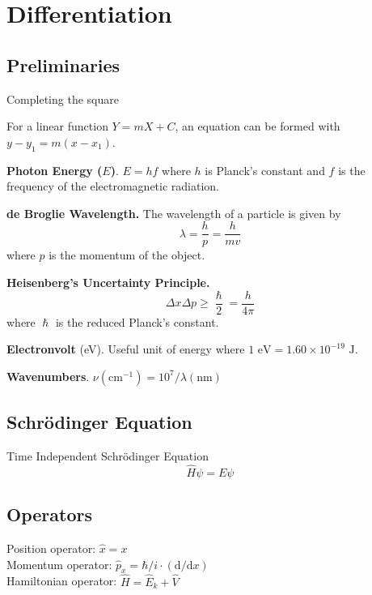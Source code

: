 
\section{Differentiation}

\subsection*{Preliminaries}

Completing the square

For a linear function $Y = mX + C$, an equation can be formed with $y - y_1 = m(x - x_1)$.

\textbf{Photon Energy ($E$)}. $E = hf$ where
$h$ is Planck's constant and $f$ is the frequency of the electromagnetic
radiation.
\vspace{\baselineskip}

\textbf{de Broglie Wavelength.} The wavelength of a particle is given by
\begin{equation*} \lambda = \frac{h}{p} = \frac{h}{mv} \end{equation*} where $p$
is the momentum of the object.
\vspace{\baselineskip}

\textbf{Heisenberg's Uncertainty Principle.} \begin{equation*} \Delta x \Delta p \geq \frac{\hslash}{2} =
  \frac{h}{4\pi} \end{equation*} where $\hslash$ is the reduced Planck's constant.
\vspace{\baselineskip}

\textbf{Electronvolt} (eV). Useful unit of energy where $1 \textrm{ eV} = 1.60 \times 10^{-19} \textrm{ J}$.
\vspace{\baselineskip}

\textbf{Wavenumbers}. $\nu(\mathrm{cm}^{-1}) = 10^7 / \lambda (\mathrm{nm})$
\vspace{\baselineskip}

\subsection*{Schrödinger Equation}
Time Independent Schrödinger Equation
\begin{equation*}
    \hat{H}\psi = E\psi
\end{equation*}

\subsection*{Operators}
Position operator: $\hat{x} = x$ \\
Momentum operator: $\hat{p}_x = \hbar/i \cdot (\mathrm{d}/\mathrm{d}x)$ \\
Hamiltonian operator: $\hat{H} = \hat{E}_k + \hat{V}$
\vspace{\baselineskip}

